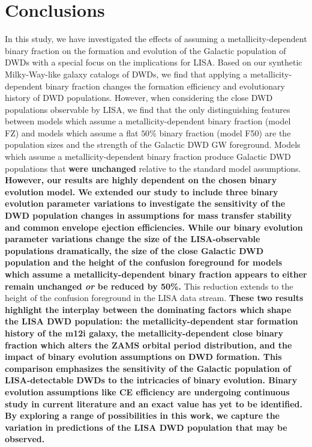 \documentclass[twocolumn, linenumbers]{aastex631}
\begin{document}
\section{Conclusions}\label{sec:conclusions}
In this study, we have investigated the effects of assuming a metallicity-dependent binary fraction on the formation and evolution of the Galactic population of DWDs with a special focus on the implications for LISA. Based on our synthetic Milky-Way-like galaxy catalogs of DWDs, we find that applying a metallicity-dependent binary fraction changes the formation efficiency and evolutionary history of DWD populations. However, when considering the close DWD populations observable by LISA, we find that the only distinguishing features between models which assume a metallicity-dependent binary fraction (model FZ) and models which assume a flat $50\%$ binary fraction (model F50) are the population sizes and the strength of the Galactic DWD GW foreground. Models which assume a metallicity-dependent binary fraction produce Galactic DWD populations that \textbf{were unchanged} relative to the standard model assumptions. \textbf{However, our results are highly dependent on the chosen binary evolution model. We extended our study to include three binary evolution \textbf{parameter variations} to investigate the sensitivity of the DWD population changes in assumptions for mass transfer stability and common envelope ejection efficiencies. While our binary evolution parameter variations change the size of the LISA-observable populations dramatically, the size of the close Galactic DWD population and the height of the confusion foreground for models which assume a metallicity-dependent binary fraction appears to either remain unchanged \emph{or} be reduced by 50\%.} This reduction extends to the height of the confusion foreground in the LISA data stream. \textbf{These two results highlight the interplay between the dominating factors which shape the LISA DWD population: the metallicity-dependent star formation history of the \textbf{m12i} galaxy, the metallicity-dependent close binary fraction which alters the ZAMS orbital period distribution, and the impact of binary evolution assumptions on DWD formation. This comparison emphasizes the sensitivity of the Galactic population of LISA-detectable DWDs to the intricacies of binary evolution. Binary evolution assumptions like CE efficiency are undergoing continuous study in current literature and an exact value has yet to be identified. By exploring a range of possibilities in this work, we capture the variation in predictions of the LISA DWD population that may be observed.}
\end{document}
